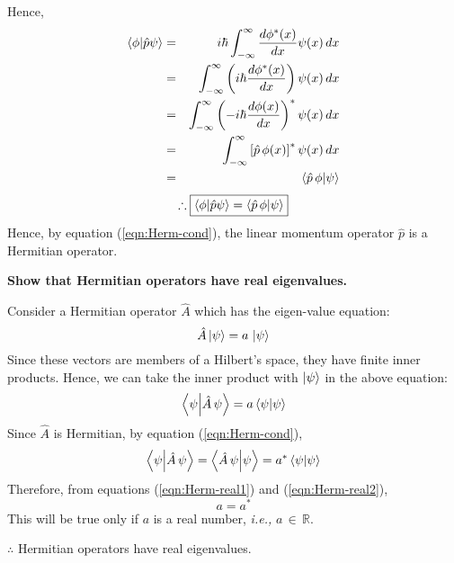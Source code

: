 \documentclass[12pt,a4paper,answers]{exam}
\newcommand{\pderx}[1]{\dfrac{d#1}{d x}}
\begin{document}
\begin{questions}
\begin{solutionorbox}
			Hence, 
			\begin{eqnarray*}
				\braket{\phi}{\hat{p}\psi}  &=&  i\hbar \int_{-\infty}^{\infty} \pderx{\phi^* (x)} \psi(x)\, dx \\
				&=& \int_{-\infty}^{\infty} \left(i\hbar \pderx{\phi^{*}(x)}\right) \psi(x)\, dx\\
				&=& \int_{-\infty}^{\infty} \left( -i \hbar \pderx{\phi(x)}  \right)^{*}\psi(x)\, dx\\
				&=& \int_{-\infty}^{\infty} \left[\hat{p}\, \phi(x)\right]^* \psi(x)\, dx\\
				&=& \braket{\hat{p}\, \phi}{\psi}
			\end{eqnarray*}
			\[ \therefore \boxed{\braket{\phi}{\hat{p}\psi} = \braket{\hat{p}\, \phi}{\psi}} \]
			Hence, by equation (\ref{eqn:Herm-cond}), the linear momentum operator $ \hat{p} $ is a Hermitian operator.
		\end{solutionorbox}
	
	\setcounter{question}{3}
	
	\question		 \textbf{Show that Hermitian operators have real eigenvalues.}
	
	\begin{solutionorbox}
		Consider a Hermitian operator $ \hat{A} $ which has the eigen-value equation:
		\begin{equation}\label{eqn:eigen}
		\hat{A} \ket{\psi} = a\, \ket{\psi}
		\end{equation}
		Since these vectors are members of a Hilbert's space, they have finite inner products. Hence, we can take the inner product with $ \ket{\psi} $ in the above equation:
		\begin{equation} \label{eqn:Herm-real1}
		\braket{\psi}{\hat{A}\, \psi} = a \braket{\psi}{\psi}
		\end{equation}
		Since $ \hat{A} $ is Hermitian, by equation (\ref{eqn:Herm-cond}), 
		\begin{equation}\label{eqn:Herm-real2}
		\braket{\psi}{\hat{A}\, \psi} = \braket{\hat{A}\, \psi}{\psi} = a^{*} \braket{\psi}{\psi}
		\end{equation}
		Therefore, from equations (\ref{eqn:Herm-real1}) and (\ref{eqn:Herm-real2}), 
		\[ a = a^* \]
		This will be true only if $ a $ is a real number, \emph{i.e.,} $ a\,\in\, \mathbb{R} $.
		
		$ \therefore $ Hermitian operators have real eigenvalues.
	\end{solutionorbox}
	

\end{questions}
\end{document}
